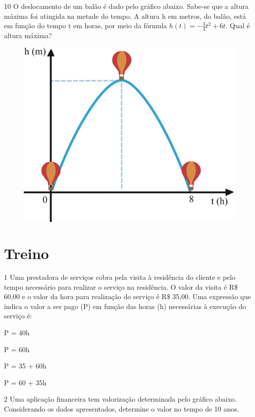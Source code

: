 \pagebreak
\num{10} O deslocamento de um balão é dado pelo gráfico abaixo. Sabe-se que a
altura máxima foi atingida na metade do tempo. A altura h em metros, do
balão, está em função do tempo t em horas, por meio da fórmula 
$h(t) = - \frac{3}{4} t^2 + 6t$. Qual é altura máxima?

\begin{figure}[htpb!]
\centering
\includegraphics[width=.5\textwidth]{./ilustras-mat/modulo_9-atividade_10.png}
\end{figure}

\begin{emptybox}
\end{emptybox}

\section{Treino}

\num{1} Uma prestadora de serviços cobra pela visita à residência do
cliente e pelo tempo necessário para realizar o serviço na residência. O
valor da visita é R\$ 60,00 e o valor da hora para realização do serviço é
R\$ 35,00. Uma expressão que indica o valor a ser pago (P) em função das
horas (h) necessárias à execução do serviço é:

\begin{escolha}
  \item P = 40h

  \item P = 60h

  \item P = 35 + 60h

  \item P = 60 + 35h
\end{escolha}

\pagebreak
\num{2} Uma aplicação financeira tem valorização determinada pelo gráfico abaixo.
Considerando os dados apresentados, determine o valor no tempo de 10 anos.

